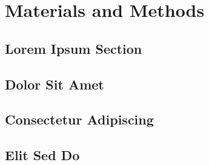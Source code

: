 \section{Materials and Methods}

\subsection{Lorem Ipsum Section}

\lipsum[1-3]

\subsection{Dolor Sit Amet}

\lipsum[4-6]

\subsection{Consectetur Adipiscing}

\lipsum[7-9]

\subsection{Elit Sed Do}

\lipsum[10-12]